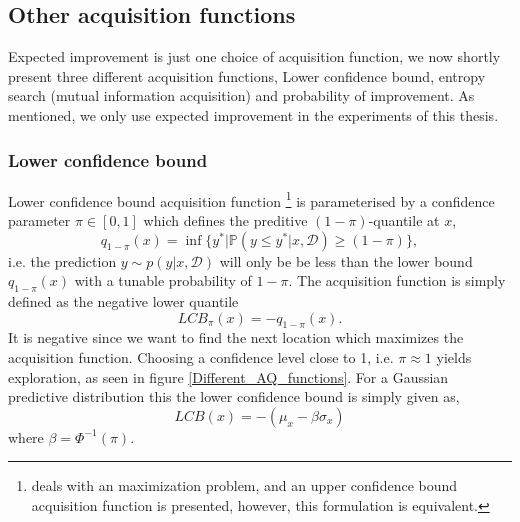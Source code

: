 \subsection{Other acquisition functions}
Expected improvement is just one choice of acquisition function, we now shortly present three different acquisition functions, 
Lower confidence bound, entropy search (mutual information acquisition) and probability of improvement. As mentioned, we
only use expected improvement in the experiments of this thesis.

\subsubsection{Lower confidence bound}
Lower confidence bound acquisition function \cite[145]{bayesoptbook}\footnote{
\cite[145]{bayesoptbook} deals with an maximization problem, and an upper confidence bound
acquisition function is presented, however, this formulation is equivalent.} is parameterised by a
confidence parameter $\pi \in [0,1]$ which defines the preditive $(1-\pi)$-quantile at $x$,
 $$q_{1-\pi}(x) = \inf \{y^*|\mathbb{P}(y\leq y^* | x, \mathcal{D}) \geq (1-\pi) \},$$
i.e. the prediction $y \sim p(y|x, \mathcal{D})$ will only be be less than the lower bound $q_{1-\pi}(x) $
with a tunable probability of $1-\pi$. 
The acquisition function is simply defined as the negative lower quantile
$$LCB_{\pi}(x) = -q_{1-\pi}(x).$$ It is negative since we want to find the next location which
maximizes the acquisition function. Choosing a confidence level close to 1, i.e. $\pi \approx 1$ yields
exploration, as seen in figure \ref{Different_AQ_functions}. For a Gaussian predictive distribution
this the lower confidence bound is simply given as, 
$$LCB(x) = - (\mu_x - \beta \sigma_x)$$
where $\beta = \Phi^{-1}(\pi)$. 


